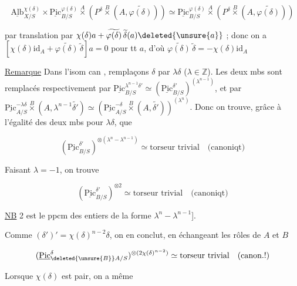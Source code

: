 \[
\underline{\mathrm{Alb}}_{X/S}^{\chi(\delta)}\times\underline{\mathrm{Pic}}^{\varphi(\delta)}_{B/S}
\overset A\times (P^\delta\overset B\times(A,\widetilde{\varphi(\delta)}))
\simeq\underline{\mathrm{Pic}}^{\varphi(\delta)}_{B/S}\overset A\times
(P^\delta\overset B\times(A,\widetilde{\varphi(\delta)}))
\]


par translation par $\chi(\delta)a+\widetilde{\varphi(\delta)}\,\widetilde\delta(a)\deleted{\unsure{a}}$ ; donc on a $[\chi(\delta)\mathrm{id}_A+\widetilde{\varphi(\delta)}\,\widetilde\delta]a=0$ pour tt $a$, d'où  $\widetilde{\varphi(\delta)}\,\widetilde\delta=-\chi(\delta)\mathrm{id}_A$

\uline{Remarque} Dans l'isom can \unsure{$(*)$}, remplaçons $\delta$ par $\lambda\delta$ ($\lambda\in\mathbb Z$). Les deux mbs sont remplacés respectivement par $\underline{\mathrm{Pic}}^{\lambda^{n-1}\delta'}_{B/S}\simeq(\underline{\mathrm{Pic}}^{\delta'}_{B/S})^{(\lambda^{n-1})}$, et par $\underline{\mathrm{Pic}}^{-\lambda\delta}_{A/S}\overset B\times(A,\lambda^{n-1}\widetilde{\delta'})\simeq(\underline{\mathrm{Pic}}^{-\delta}_{A/S}\overset B\times(A,\widetilde{\delta'}))^{(\lambda^n)}$. Donc on trouve, grâce à l'égalité des deux mbs pour $\lambda\delta$, que

\[
(\underline{\mathrm{Pic}}^{\delta'}_{B/S})^{\otimes(\lambda^n-\lambda^{n-1})}\simeq\text{torseur trivial}\quad\text{(canoniqt)}
\]

Faisant $\lambda=-1$, on trouve

\[
(\underline{\mathrm{Pic}}^{\delta'}_{B/S})^{\otimes2}\simeq\text{torseur trivial}\quad\text{(canoniqt)}
\]


\uline{NB} 2 est le ppcm des entiers de la forme $\lambda^n-\lambda^{n-1}$].

 Comme $(\delta')'=\chi(\delta)^{n-2}\delta$, on en conclut, en échangeant les rôles de $A$ et $B$

\[
(\underline{\mathrm{Pic}}^\delta_{\deleted{\unsure{B}}A/S})^{\otimes(2\chi(\delta)^{n-2})}\simeq\text{torseur trivial}\quad\text{(canon.!)}
\]


Lorsque $\chi(\delta)$ est pair, on a même


